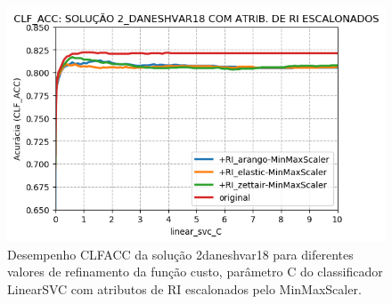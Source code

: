 \begin{figure}[ht]
    \centering
    \caption{Desempenho CLF\underscore{}ACC da solução 2\underscore{}daneshvar18 para diferentes valores de refinamento da função custo, parâmetro C do classificador LinearSVC com atributos de RI escalonados pelo MinMaxScaler.}
    \vspace{-0.5cm}
    \begin{center}
        \includegraphics[scale=0.75]{img/clf-acc-2-daneshvar18-ir-scaled.png}
    \end{center}
    \vspace{-0.5cm}
    \label{fig:clf-acc-2-daneshvar18-ir-scaled}
\end{figure}